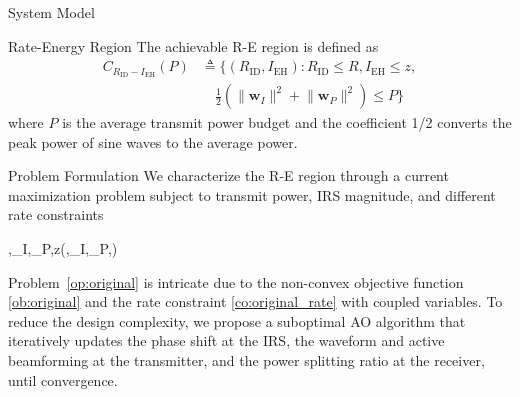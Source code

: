 \documentclass[journal]{IEEEtran}
\begin{document}
\begin{section}{System Model}
		\begin{subsection}{Rate-Energy Region}
			The achievable R-E region is defined as
			\begin{align}
				C_{R_{\text{ID}}-I_{\text{EH}}}(P)
				&\triangleq \biggl\{(R_{\text{ID}}, I_{\text{EH}}): R_{\text{ID}} \le R, I_{\text{EH}} \le z,\nonumber\\
				&\quad \frac{1}{2}\left(\lVert{\boldsymbol{w}_I}\rVert^2+\lVert{\boldsymbol{w}_P}\rVert^2\right) \le P\biggr\}
			\end{align}
			where $P$ is the average transmit power budget and the coefficient \num{1/2} converts the peak power of sine waves to the average power.
		\end{subsection}
	\end{section}


	\begin{section}{Problem Formulation}\label{se:problem_formulation}
		We characterize the R-E region through a current maximization problem subject to transmit power, IRS magnitude, and different rate constraints
		\begin{maxi!}
			{\boldsymbol{\phi},\boldsymbol{w}_I,_P,\rho}{z(\boldsymbol{\phi},\boldsymbol{w}_I,_P,\rho)}{\label{op:original}}{\label{ob:original}}
			\label{co:original_power}
			\label{co:original_rate}
			\label{co:original_modulus}
		\end{maxi!}
		Problem~\ref{op:original} is intricate due to the non-convex objective function \ref{ob:original} and the rate constraint \ref{co:original_rate} with coupled variables. To reduce the design complexity, we propose a suboptimal AO algorithm that iteratively updates the phase shift at the IRS, the waveform and active beamforming at the transmitter, and the power splitting ratio at the receiver, until convergence.



\end{section}
\end{document}
